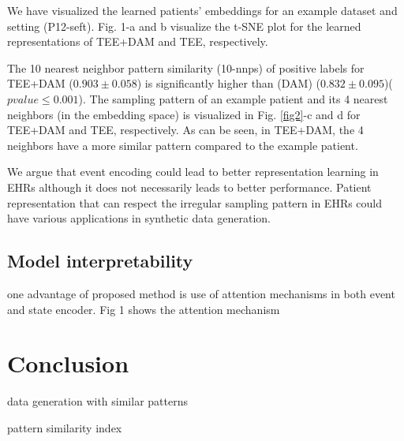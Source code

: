 \documentclass[journal,twoside,web]{ieeecolor}
\begin{document}
We have visualized the learned patients' embeddings for an example dataset and setting (P12-seft). Fig. 1-a and b visualize the t-SNE plot for the learned representations of TEE+DAM and TEE, respectively. 

The 10 nearest neighbor pattern similarity (10-nnps) of positive labels for TEE+DAM ($0.903 \pm 0.058 $) is significantly higher than (DAM) ($0.832 \pm 0.095$)($pvalue \leq 0.001$). The sampling pattern of an example patient and its 4 nearest neighbors (in the embedding space) is visualized in Fig. \ref*{fig2}-c and d for TEE+DAM and TEE, respectively. As can be seen, in TEE+DAM, the 4 neighbors have a more similar pattern compared to the example patient. 

We argue that event encoding could lead to better representation learning in EHRs although it does not necessarily leads to better performance. Patient representation that can respect the irregular sampling pattern in EHRs could have various applications in synthetic data generation.



\subsection{Model interpretability}

one advantage of proposed method is use of attention mechanisms in both event and state encoder.
Fig 1 shows the attention mechanism





\section{Conclusion}
\label{sec:Conclusion}

data generation with similar patterns

pattern similarity index









\end{document}
